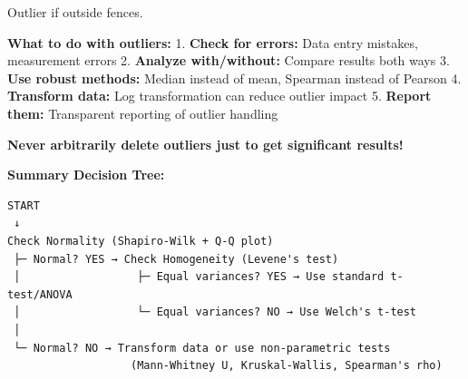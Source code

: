 \documentclass[11pt]{article}
\begin{document}
Outlier if outside fences.

\textbf{What to do with outliers:} 1. \textbf{Check for errors:} Data
entry mistakes, measurement errors 2. \textbf{Analyze with/without:}
Compare results both ways 3. \textbf{Use robust methods:} Median instead
of mean, Spearman instead of Pearson 4. \textbf{Transform data:} Log
transformation can reduce outlier impact 5. \textbf{Report them:}
Transparent reporting of outlier handling

\textbf{Never arbitrarily delete outliers just to get significant
results!}

\textbf{Summary Decision Tree:}

\begin{verbatim}
START
 ↓
Check Normality (Shapiro-Wilk + Q-Q plot)
 ├─ Normal? YES → Check Homogeneity (Levene's test)
 │                  ├─ Equal variances? YES → Use standard t-test/ANOVA
 │                  └─ Equal variances? NO → Use Welch's t-test
 │
 └─ Normal? NO → Transform data or use non-parametric tests
                   (Mann-Whitney U, Kruskal-Wallis, Spearman's rho)
\end{verbatim}
\end{document}
